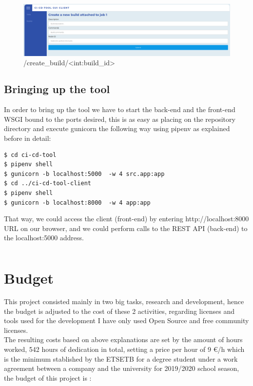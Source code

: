 \documentclass{article}
\begin{document}
\begin{figure}[H]
    \centering
    \includegraphics[scale=0.2]{create_build}
    \caption{/create\_build/<int:build\_id>}
\end{figure}

\subsection{Bringing up the tool}

In order to bring up the tool we have to start the back-end and the front-end WSGI bound to the ports desired, this is as easy as placing on the repository directory and execute gunicorn the following way using pipenv as explained before in detail:
~\\

\begin{lstlisting}
$ cd ci-cd-tool
$ pipenv shell
$ gunicorn -b localhost:5000  -w 4 src.app:app 
$ cd ../ci-cd-tool-client
$ pipenv shell
$ gunicorn -b localhost:8000  -w 4 app:app 
\end{lstlisting}

That way, we could access the client (front-end) by entering http://localhost:8000 URL on our browser, and we could perform calls to the REST API (back-end) to the localhost:5000 address.

\begin{lstlisting}

\end{lstlisting}


\newpage
\section{Budget}

This project consisted mainly in two big tasks, research and development, hence the budget is adjusted to  the cost of these 2 activities, regarding licenses and tools used for the development I have only used Open Source and free community licenses.
~\\

The resulting costs based on above explanations are set by the amount of hours worked, 542 hours of dedication in total, setting a price per hour of 9 €/h which is the minimum stablished by the ETSETB for a degree student under a work agreement between a company and the university for 2019/2020 school season, the budget of this project is :
~\\
\end{document}

